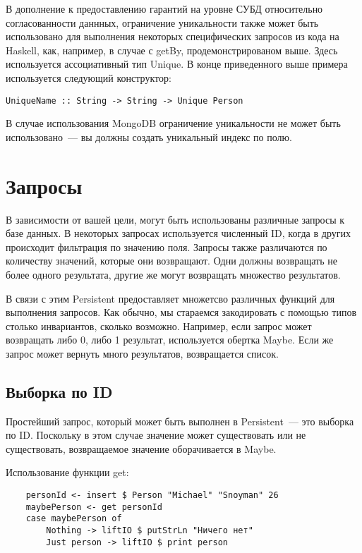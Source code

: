 В дополнение к предоставлению гарантий на уровне СУБД относительно согласованности даннных, ограничение уникальности также может быть использовано для выполнения некоторых специфических запросов из кода на Haskell, как, например, в случае с getBy, продемонстрированом выше. Здесь используется ассоциативный тип Unique. В конце приведенного выше примера используется следующий конструктор:

\begin{lstlisting}
UniqueName :: String -> String -> Unique Person
\end{lstlisting}

\begin{remark}
В случае использования MongoDB ограничение уникальности не может быть использовано~--- вы должны создать уникальный индекс по полю.
\end{remark}

\section{Запросы} %

В зависимости от вашей цели, могут быть использованы различные запросы к базе данных. В некоторых запросах используется численный ID, когда в других происходит фильтрация по значению поля. Запросы также различаются по количеству значений, которые они возвращают. Одни должны возвращать не более одного результата, другие же могут возвращать множество результатов.

В связи с этим Persistent предоставляет множетсво различных функций для выполнения запросов. Как обычно, мы стараемся закодировать с помощью типов столько инвариантов, сколько возможно. Например, если запрос может возвращать либо 0, либо 1 результат, используется обертка Maybe. Если же запрос может вернуть много результатов, возвращается список.

\subsection{Выборка по ID} %

Простейший запрос, который может быть выполнен в Persistent~--- это выборка по ID. Поскольку в этом случае значение может существовать или не существовать, возвращаемое значение оборачивается в Maybe.

Использование функции get:

\begin{lstlisting}
    personId <- insert $ Person "Michael" "Snoyman" 26
    maybePerson <- get personId
    case maybePerson of
        Nothing -> liftIO $ putStrLn "Ничего нет"
        Just person -> liftIO $ print person
\end{lstlisting}%

